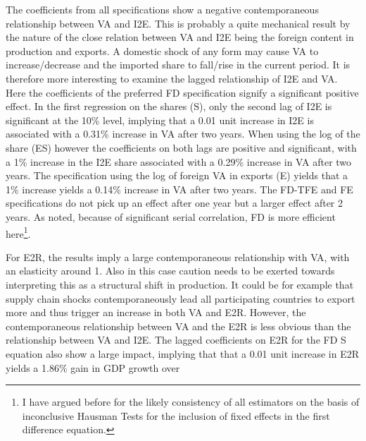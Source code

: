 \documentclass[a4paper]{article}
\begin{document}
The coefficients from all specifications show a negative contemporaneous relationship between VA and I2E. This is probably a quite mechanical result by the nature of the close relation between VA and I2E being the foreign content in production and exports. A domestic shock of any form may cause VA to increase/decrease and the imported share to fall/rise in the current period. It is therefore more interesting to examine the lagged relationship of I2E and VA. Here the coefficients of the preferred FD specification signify a significant positive effect. In the first regression on the shares (S), only the second lag of I2E is significant at the 10\% level, implying that a 0.01 unit increase in I2E is associated with a 0.31\% increase in VA after two years. When using the log of the share (ES) however the coefficients on both lags are positive and significant, with a 1\% increase in the I2E share associated with a  0.29\% increase in VA after two years. The specification using the log of foreign VA in exports (E) yields that a 1\% increase yields a 0.14\% increase in VA after two years. The FD-TFE and FE specifications do not pick up an effect after one year but a larger effect after 2 years. As noted, because of significant serial correlation, FD is more efficient here\footnote{I have argued before for the likely consistency of all estimators on the basis of inconclusive Hausman Tests for the inclusion of fixed effects in the first difference equation.}. \newline    %

For E2R, the results imply a large contemporaneous relationship with VA, with an elasticity around 1. Also in this case caution needs to be exerted towards interpreting this as a structural shift in production. It could be for example that supply chain shocks contemporaneously lead all participating countries to export more and thus trigger an increase in both VA and E2R. However, the contemporaneous relationship between VA and the E2R is less obvious than the relationship between VA and I2E. The lagged coefficients on E2R for the FD S equation also show a large impact, implying that that a 0.01 unit increase in E2R yields a 1.86\% gain in GDP growth over
\end{document}
